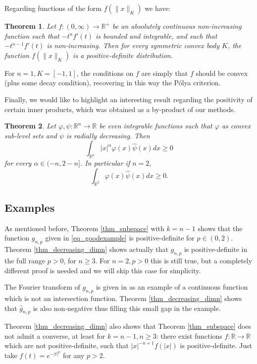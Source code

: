 \documentclass{amsart}
\newtheorem{theorem}{Theorem}
\def \R {\mathbb R}
\begin{document}
Regarding functions of the form $f(\|x\|_K)$ we have:
\begin{theorem}
	\label{thm_omega}
	Let $f:(0,\infty) \to \R^+$ be an absolutely continuous non-increasing function such that $-t^n f'(t)$ is bounded and integrable, and such that $-t^{n-1} f'(t)$ is non-increasing.
	Then for every symmetric convex body $K$, the function $f(\|x\|_K)$ is a positive-definite distribution.
\end{theorem}

For $n=1, K=[-1,1]$, the conditions on $f$ are simply that $f$ should be convex (plus some decay condition), recovering in this way the P\'olya criterion.


Finally, we would like to highlight an interesting result regarding the positivity of certain inner products, which was obtained as a by-product of our methods.
\begin{theorem}
	\label{thm_convex_curiosity}
	Let $\varphi, \psi:\R^n \to \R$ be even integrable functions such that $\varphi$ as convex sub-level sets and $\psi$ is radially decreasing.
	Then
	\[\int_{\R^n} |x|^\alpha \varphi(x) \hat \psi(x) dx \geq 0\]
	for every $\alpha \in (-n, 2-n]$.
	In particular if $n=2$, 
	\[\int_{\R^2} \varphi(x) \hat \psi(x) dx \geq 0.\]
\end{theorem}

\subsection{Examples}

As mentioned before, Theorem \ref{thm_subspace} with $k=n-1$ shows that the function $g_{n,p}$ given in \eqref{eq_goodexample} is positive-definite for $p \in (0,2)$.
Theorem \ref{thm_decreasing_dimn} shows actually that $g_{n,p}$ is positive-definite in the full range $p > 0$, for $n \geq 3$.
For $n=2, p>0$ this is still true, but a completely different proof is needed and we will skip this case for simplicity.

The Fourier transform of $g_{n,p}$ is given in \cite[Example 4.7]{koldobsky2023comparison} as an example of a continuous function which is not an intersection function.
Theorem \ref{thm_decreasing_dimn} shows that $\hat g_{n,p}$ is also non-negative thus filling this small gap in the example.

Theorem \ref{thm_decreasing_dimn} also shows that Theorem \ref{thm_subspace} does not admit a converse, at least for $k = n-1, n\geq 3$: there exist functions $f:\R \to \R$ which are not positive-definite, such that $|x|^{-n+1} f(|x|)$ is positive-definite. Just take $f(t) = e^{-|t|^p}$ for any $p > 2$.
\end{document}
